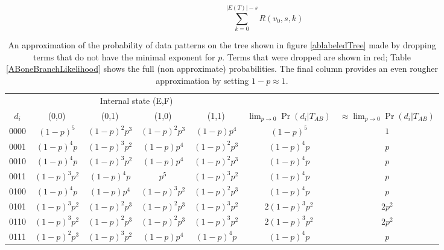 \documentclass[11pt]{article}
\begin{document}
$$	 \sum_{k=0}^{|E(T)| - s}R(v_0, s, k)$$
\begin{table}[htdp]
\begin{center}
\caption{An approximation of the probability of data patterns on the tree shown in figure \ref{ablabeledTree} made
by dropping terms that do not have the minimal exponent for $p$.
Terms that were dropped are shown in red; Table \ref{ABoneBranchLikelihood} shows the full (non approximate) probabilities.
The final column provides an even rougher approximation by setting $1-p\approx 1$.
}\label{lowPLikelihoods}
\begin{tabular}{|c|c|c|c|c|c|c|}
\hline 
             & \multicolumn{4}{c|}{Internal state (E,F)} &  & \\ 
$d_i$ & (0,0) & (0,1) & (1,0) & (1,1) &  $\lim_{p\rightarrow 0}\Pr(d_i|T_{AB})$ & $\approx \lim_{p\rightarrow 0}\Pr(d_i|T_{AB})$ \\ 
\hline
0000  & {\color{black}$(1-p)^5 $ } & {\color{red}$(1-p)^2 p^3 $ } & {\color{red}$(1-p)^2 p^3 $ } & {\color{red}$(1-p) p^4 $  }      & $(1-p)^5$ & $1$ \\
0001  & {\color{black}$(1-p)^4 p $ } & {\color{red}$(1-p)^3 p^2 $ } & {\color{red}$(1-p) p^4 $ } & {\color{red}$(1-p)^2 p^3 $ }     & $(1-p)^4 p$  & $p$ \\
0010  & {\color{black}$(1-p)^4 p $ } & {\color{red}$(1-p)^3 p^2 $ } & {\color{red}$(1-p) p^4 $ } & {\color{red}$(1-p)^2 p^3 $ }     & $(1-p)^4 p$ & $p$ \\
0011  & {\color{red}$(1-p)^3 p^2 $ } & {\color{black}$(1-p)^4 p $ } & {\color{red}$p^5 $ } & {\color{red}$(1-p)^3 p^2 $ }           & $(1-p)^4 p$ & $p$ \\
0100  & {\color{black}$(1-p)^4 p $ } & {\color{red}$(1-p) p^4 $ } & {\color{red}$(1-p)^3 p^2 $ } & {\color{red}$(1-p)^2 p^3 $ }     & $(1-p)^4 p$ & $p$ \\
0101  & {\color{black}$(1-p)^3 p^2 $ } & {\color{red}$(1-p)^2 p^3 $ } & {\color{red}$(1-p)^2 p^3 $ } & {\color{black}$(1-p)^3 p^2 $ } & $2 (1-p)^3 p^2$ & $2p^2$ \\
0110  & {\color{black}$(1-p)^3 p^2 $ } & {\color{red}$(1-p)^2 p^3 $ } & {\color{red}$(1-p)^2 p^3 $ } & {\color{black}$(1-p)^3 p^2 $ } & $2 (1-p)^3 p^2$ & $2p^2$ \\
0111  & {\color{red}$(1-p)^2 p^3 $ } & {\color{red}$(1-p)^3 p^2 $ } & {\color{red}$(1-p) p^4 $ } & {\color{black}$(1-p)^4 p $ }     & $(1-p)^4 p$ & $p$ \\
\hline
\end{tabular}
\end{center}
\end{table}
\end{document}
